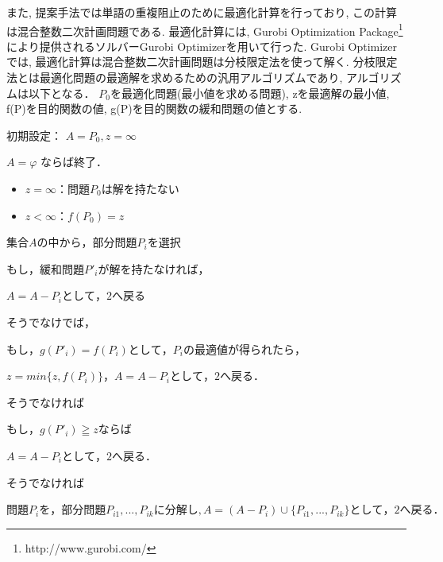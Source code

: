 \documentclass[syuuron]{kuee}
\begin{document}
		また, 提案手法では単語の重複阻止のために最適化計算を行っており, この計算は混合整数二次計画問題である. 
		最適化計算には, Gurobi Optimization Package\footnote{http://www.gurobi.com/}により提供されるソルバーGurobi Optimizerを用いて行った.
		Gurobi Optimizerでは, 最適化計算は混合整数二次計画問題は分枝限定法を使って解く. 
		分枝限定法とは最適化問題の最適解を求めるための汎用アルゴリズムであり, アルゴリズムは以下となる．
		$P_0$を最適化問題(最小値を求める問題), zを最適解の最小値, f(P)を目的関数の値, g(P)を目的関数の緩和問題の値とする. 
				
				\begin{enumerate}
					\item 初期設定： $A = {P_0}, z = ∞$
					\item $A = φ$ ならば終了．
						\begin{itemize}
						\item $z = ∞： 問題 P_0 は解を持たない$
						\item $z < ∞： f(P_0) = z$
						\end{itemize}
					\item $集合 A の中から，部分問題 P_i を選択$
					\item $もし，緩和問題 P'_i が解を持たなければ，$
					そうでなけでば，
						\item そうでなければ
							\item そうでなければ
						\end{description}
					\end{description}
				\end{enumerate}
\end{document}
